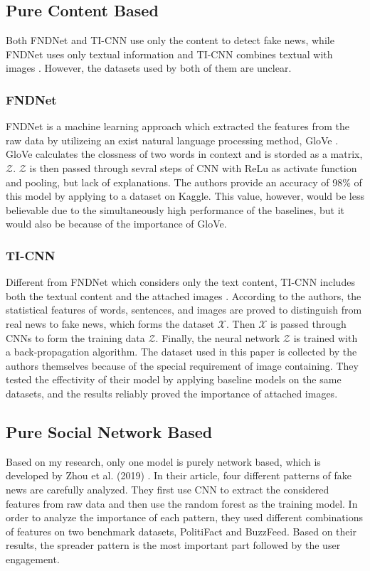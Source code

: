 \documentclass[sigconf ,nonacm]{acmart}
\begin{document}
\subsection{Pure Content Based}
Both FNDNet and TI-CNN use only the content to detect fake news, while FNDNet uses only textual information and TI-CNN combines textual with images \cite{FNDNet,yang2018ti}. However, the datasets used by both of them are unclear.

\subsubsection{FNDNet}
FNDNet \cite{FNDNet} is a machine learning approach which extracted the features from the raw data by utilizeing an exist natural language processing method, GloVe \cite{glove}. GloVe calculates the clossness of two words in context and is storded as a matrix, $\mathcal{Z}$. $\mathcal{Z}$ is then passed through sevral steps of CNN with ReLu as activate function and pooling, but lack of explanations. The authors provide an accuracy of 98\% of this model by applying to a dataset on Kaggle. This value, however, would be less believable due to the simultaneously high performance of the baselines, but it would also be because of the importance of GloVe.

\subsubsection{TI-CNN}
Different from FNDNet which considers only the text content, TI-CNN includes both the textual content and the attached images \cite{yang2018ti}. According to the authors, the statistical features of words, sentences, and images are proved to distinguish from real news to fake news, which forms the dataset $\mathcal{X}$. Then $\mathcal{X}$ is passed through CNNs to form the training data $\mathcal{Z}$. Finally, the neural network $\mathcal{Z}$ is trained with a back-propagation algorithm. The dataset used in this paper is collected by the authors themselves because of the special requirement of image containing. They tested the effectivity of their model by applying baseline models on the same datasets, and the results reliably proved the importance of attached images.

\subsection{Pure Social Network Based}
Based on my research, only one model is purely network based, which is developed by Zhou et al. (2019) \cite{NetworkBased}. In their article, four different patterns of fake news are carefully analyzed. They first use CNN to extract the considered features from raw data and then use the random forest as the training model. In order to analyze the importance of each pattern, they used different combinations of features on two benchmark datasets, PolitiFact and BuzzFeed. Based on their results, the spreader pattern is the most important part followed by the user engagement.
\end{document}

